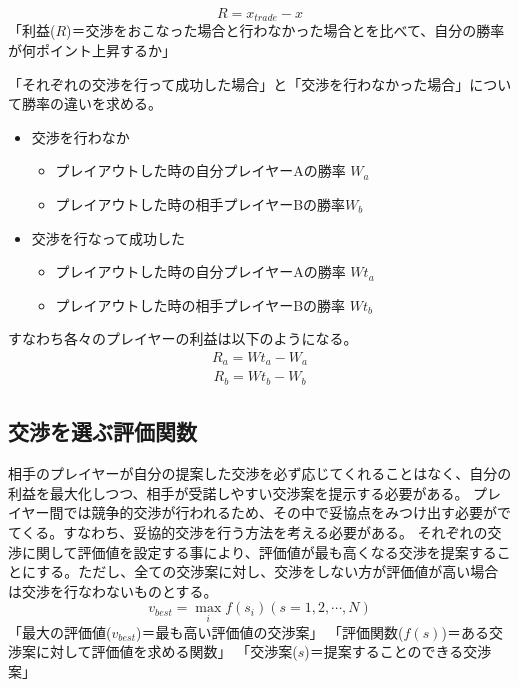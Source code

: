 \documentclass[a4, 10pt,dvipdfmx]{jsarticle}
\begin{document}
\begin{equation}
  R = x_{trade} - x
\end{equation}
「利益($R$)＝交渉をおこなった場合と行わなかった場合とを比べて、自分の勝率が何ポイント上昇するか」

「それぞれの交渉を行って成功した場合」と「交渉を行わなかった場合」について勝率の違いを求める。
\begin{itemize}
 \item 交渉を行わなか
    \begin{itemize}
      \item プレイアウトした時の自分プレイヤーAの勝率 $W_a$
      \item プレイアウトした時の相手プレイヤーBの勝率$W_b$
     \end{itemize}
 \item 交渉を行なって成功した
    \begin{itemize}
      \item プレイアウトした時の自分プレイヤーAの勝率 $Wt_a$
      \item プレイアウトした時の相手プレイヤーBの勝率 $Wt_b$
     \end{itemize}
\end{itemize}
すなわち各々のプレイヤーの利益は以下のようになる。
\begin{eqnarray}
  R_{a}=Wt_a - W_a
\end{eqnarray}
\begin{eqnarray}
  R_{b}=Wt_b - W_b
\end{eqnarray}


\subsection{交渉を選ぶ評価関数}
相手のプレイヤーが自分の提案した交渉を必ず応じてくれることはなく、自分の利益を最大化しつつ、相手が受諾しやすい交渉案を提示する必要がある。
プレイヤー間では競争的交渉が行われるため、その中で妥協点をみつけ出す必要がでてくる。すなわち、妥協的交渉を行う方法を考える必要がある。
それぞれの交渉に関して評価値を設定する事により、評価値が最も高くなる交渉を提案することにする。ただし、全ての交渉案に対し、交渉をしない方が評価値が高い場合は交渉を行なわないものとする。  
\begin{equation}
  v_{best} =  \max_{i}f(s_{i}) ( s = 1, 2, \cdots, N )
\end{equation}
「最大の評価値($v_{best}$)＝最も高い評価値の交渉案」
「評価関数($f(s)$)＝ある交渉案に対して評価値を求める関数」
「交渉案($s$)＝提案することのできる交渉案」
\end{document}
